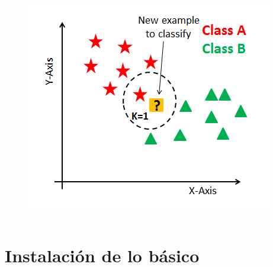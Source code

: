 \documentclass[10pt]{beamer}
\begin{document}
\begin{frame}
\begin{columns}
\hspace{3mm}
\hspace{3mm}
\begin{column}{.33\textwidth}
\hspace{5mm}
\hspace{5mm}
\vspace{-3mm}
 \begin{figure}
 \includegraphics[scale=0.35]{./Figures/nearest.png} 
 \end{figure}  
\end{column}%


\end{columns}
\end{frame}


\section{Instalaci\'on de lo b\'asico}
\end{document}

